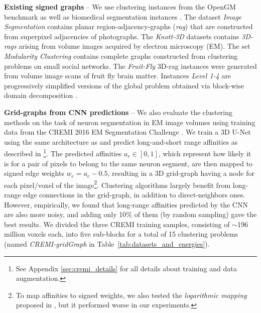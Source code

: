 \textbf{Existing signed graphs}  -- We use clustering instances from the OpenGM benchmark \cite{kappes2013comparative} as well as biomedical segmentation instances \cite{pape2017solving}. The dataset \emph{Image Segmentation} contains planar region-adjacency-graphs (\emph{rag}) that are constructed from superpixel adjacencies of photographs. The \emph{Knott-3D} datasets contains \emph{3D-rags} arising from volume images acquired by electron microscopy (EM). The set \emph{Modularity Clustering} contains complete graphs constructed from clustering problems on small social networks. The \emph{Fruit-Fly} 3D-rag instances were generated from volume image scans of fruit fly brain matter. Instances \emph{Level 1-4} are progressively simplified versions of the global problem obtained via block-wise domain decomposition \cite{pape2017solving}.

\textbf{Grid-graphs from CNN predictions} -- We also evaluate the clustering methods on the task of neuron segmentation in EM image volumes using training data from the CREMI 2016 EM Segmentation Challenge \cite{cremiChallenge}.
We train a 3D U-Net \cite{ronneberger2015u,cciccek20163d} using the same architecture as \cite{funke2018large} and predict long-and-short range affinities 
as described in \cite{lee2017superhuman}\footnote{See Appendix \ref{sec:cremi_details} for all details about training and data augmentation.}. The predicted affinities $a_e\in[0,1]$, which represent how likely it is for a pair of pixels to belong to the same neuron segment, are then mapped to signed edge weights $w_e=a_e-0.5$, resulting in a 3D grid-graph having a node for each pixel/voxel of the  image\footnote{To map affinities to signed weights, we also tested the \emph{logarithmic mapping} proposed in \cite{finkel2008enforcing,andres2012globally}, but it performed worse in our experiments.}. 
Clustering algorithms largely benefit from long-range edge connections in the grid-graph, in addition to direct-neighbors ones. However, empirically, we found that long-range affinities predicted by the CNN are also more noisy, and adding only 10\% of them (by random sampling) gave the best results.
We divided the three CREMI training samples, consisting of $\sim$196 million voxels each, into five sub-blocks for a total of 15 clustering problems (named \emph{CREMI-gridGraph} in Table~\ref{tab:datasets_and_energies}). 

